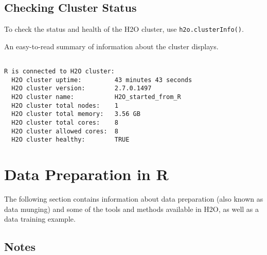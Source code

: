 {{\subsection{Checking Cluster Status}


To check the status and health of the H2O cluster, use {\texttt{h2o.clusterInfo()}}.

\waterExampleInR
\medskip



An easy-to-read summary of information about the cluster displays. 

\begin{lstlisting}[style=R]

R is connected to H2O cluster:
  H2O cluster uptime:         43 minutes 43 seconds
  H2O cluster version:        2.7.0.1497
  H2O cluster name:           H2O_started_from_R
  H2O cluster total nodes:    1
  H2O cluster total memory:   3.56 GB
  H2O cluster total cores:    8
  H2O cluster allowed cores:  8
  H2O cluster healthy:        TRUE

\end{lstlisting}

\section{Data Preparation in R}

The following section contains information about data preparation (also known as data munging) and some of the tools and methods available in H2O, as well as a data training example. 

\subsection{Notes}
\begin{itemize}


\end{itemize}}}
